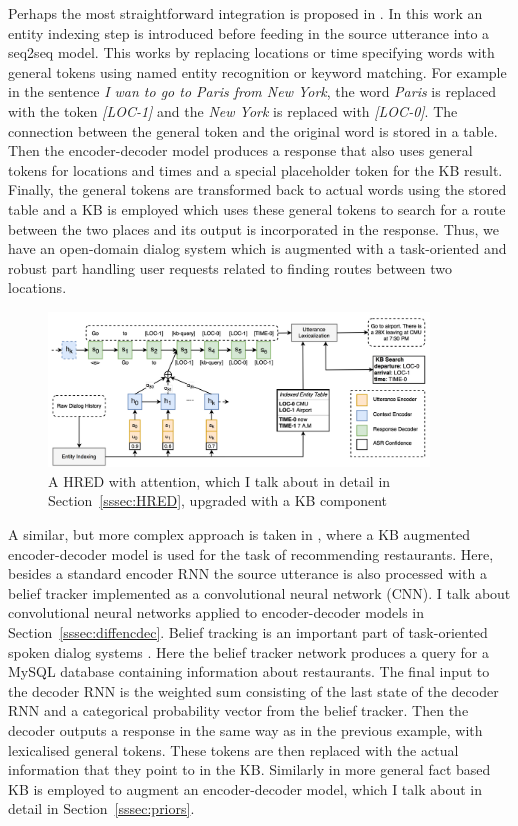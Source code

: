 \documentclass[12pt]{article}
\begin{document}
Perhaps the most straightforward integration is proposed in \cite{Zhao:2017}. In this work an entity indexing step is introduced before feeding in the source utterance into a seq2seq model. This works by replacing locations or time specifying words with general tokens using named entity recognition or keyword matching. For example in the sentence \textit{I wan to go to Paris from New York}, the word \textit{Paris} is replaced with the token \textit{[LOC-1]} and the \textit{New York} is replaced with \textit{[LOC-0]}. The connection between the general token and the original word is stored in a table.  Then the encoder-decoder model produces a response that also uses general tokens for locations and times and a special placeholder token for the KB result. Finally, the general tokens are transformed back to actual words using the stored table and a KB is employed which uses these general tokens to search for a route between the two places and its output is incorporated in the response. Thus, we have an open-domain dialog system which is augmented with a task-oriented and robust part handling user requests related to finding routes between two locations.

\begin{figure}[H]
	\centering
	\includegraphics[width=0.9\textwidth]{pics/KB.png}
	\caption{A HRED with attention, which I talk about in detail in Section~\ref{sssec:HRED}, upgraded with a KB component \cite{Zhao:2017}}
	\label{fig:KB}
\end{figure}

A similar, but more complex approach is taken in \cite{Wen:2016}, where a KB augmented encoder-decoder model is used for the task of recommending restaurants. Here, besides a standard encoder RNN the source utterance is also processed with a belief tracker implemented as a convolutional neural network (CNN). I talk about convolutional neural networks applied to encoder-decoder models in Section~\ref{sssec:diffencdec}. Belief tracking is an important part of task-oriented spoken dialog systems \cite{Henderson:2015}. Here the belief tracker network produces a query for a MySQL database containing information about restaurants. The final input to the decoder RNN is the weighted sum consisting of the last state of the decoder RNN and a categorical probability vector from the belief tracker. Then the decoder outputs a response in the same way as in the previous example, with lexicalised general tokens. These tokens are then replaced with the actual information that they point to in the KB. Similarly in \cite{Ghazvininejad:2017} more general fact based KB is employed to augment an encoder-decoder model, which I talk about in detail in Section~\ref{sssec:priors}.
\end{document}
